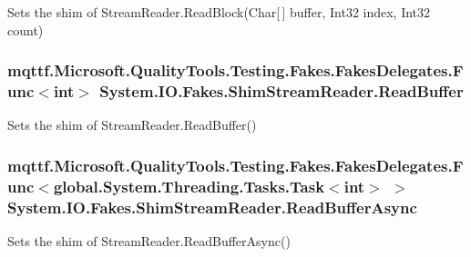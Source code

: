 Sets the shim of Stream\-Reader.\-Read\-Block(\-Char\mbox{[}$\,$\mbox{]} buffer, Int32 index, Int32 count)

\hypertarget{class_system_1_1_i_o_1_1_fakes_1_1_shim_stream_reader_a104dad17f6074045365ed015a79d271d}{
\subsubsection[{Read\-Buffer}]{\setlength{\rightskip}{0pt plus 5cm}mqttf.\-Microsoft.\-Quality\-Tools.\-Testing.\-Fakes.\-Fakes\-Delegates.\-Func$<$int$>$ System.\-I\-O.\-Fakes.\-Shim\-Stream\-Reader.\-Read\-Buffer\hspace{0.3cm}{\ttfamily [set]}}}\label{class_system_1_1_i_o_1_1_fakes_1_1_shim_stream_reader_a104dad17f6074045365ed015a79d271d}


Sets the shim of Stream\-Reader.\-Read\-Buffer()

\hypertarget{class_system_1_1_i_o_1_1_fakes_1_1_shim_stream_reader_a09ba94e177c7ec6439fd08599c0c6512}{
\subsubsection[{Read\-Buffer\-Async}]{\setlength{\rightskip}{0pt plus 5cm}mqttf.\-Microsoft.\-Quality\-Tools.\-Testing.\-Fakes.\-Fakes\-Delegates.\-Func$<$global.\-System.\-Threading.\-Tasks.\-Task$<$int$>$ $>$ System.\-I\-O.\-Fakes.\-Shim\-Stream\-Reader.\-Read\-Buffer\-Async\hspace{0.3cm}{\ttfamily [set]}}}\label{class_system_1_1_i_o_1_1_fakes_1_1_shim_stream_reader_a09ba94e177c7ec6439fd08599c0c6512}


Sets the shim of Stream\-Reader.\-Read\-Buffer\-Async()

